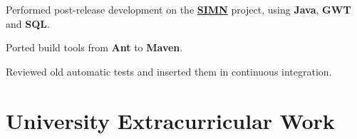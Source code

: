 \documentclass[a4paper]{deedy-resume} %
\begin{document}
\begin{minipage}[t]{0.64\textwidth}
\sectionspace %


\href{http://www.opensoft.pt/}{}

\begin{tightitemize}
    \item Performed post-release development on the \textbf{\href{http://www.opensoft.pt/simn/}{SIMN}} project, using \textbf{Java}, \textbf{GWT} and \textbf{SQL}.
    \item Ported build tools from \textbf{Ant} to \textbf{Maven}.
    \item Reviewed old automatic tests and inserted them in continuous integration.
\end{tightitemize}

\sectionspace %


\begin{comment}
\section{Research}

\href{https://nunoxu.github.io/downloads/MSc_Trust_HAI.pdf}{\runsubsection{Trustful Action Suggestion\\ in Human Agent Interaction}}
\descript{| MSc Thesis}

\location{September 2015 - Nov 2016 (14 months) | IST - Lisbon, PT}
In order to increase \textbf{trustfulness} in \textbf{virtual agents}, this research aimed to create a module that will suggest actions to improve trust on the agent. To this end, a \textbf{cognitive trust model} was also being implemented.


\sectionspace %
\end{comment}


\section{University Extracurricular Work}



\end{minipage}
\end{document}
